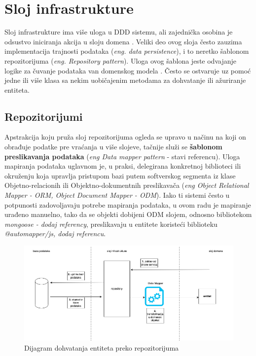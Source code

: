 \documentclass[12pt,oneside]{memoir}
\begin{document}
\section{Sloj infrastrukture}

Sloj infrastrukture ima više uloga u DDD sistemu, ali zajednička osobina je odsustvo iniciranja akcija u sloju domena \cite{dddfull}. Veliki deo ovog sloja često zauzima implementacija trajnosti podataka (\textit{eng. data persistence}), i to neretko šablonom repozitorijuma (\textit{eng. Repository pattern}). Uloga ovog šablona jeste odvajanje logike za čuvanje podataka van domenskog modela \cite{msrepository}. Često se ostvaruje uz pomoć jedne ili više klasa sa nekim uobičajenim metodama za dohvatanje ili ažuriranje entiteta.


\subsection{Repozitorijumi}
Apstrakcija koju pruža sloj repozitorijuma ogleda se upravo u načinu na koji on obrađuje podatke pre vraćanja u više slojeve, tačnije služi se \textbf{šablonom preslikavanja podataka} (\textit{eng Data mapper pattern} - stavi referencu). Uloga mapiranja podataka uglavnom je, u praksi, delegirana konkretnoj biblioteci ili okruženju koja upravlja pristupom bazi putem softverskog segmenta iz klase Objetno-relacionih ili Objektno-dokumentnih preslikavača (\textit{eng Object Relational Mapper - ORM, Object Document Mapper - ODM}). Iako ti sistemi često u potpunosti zadovoljavaju potrebe mapiranja podataka, u ovom radu je mapiranje urađeno manuelno, tako da se objekti dobijeni ODM slojem, odnosno bibliotekom \textit{mongoose - dodaj referency}, preslikavaju u entitete koristeći biblioteku \textit{@automapper/js, dodaj referencu}.

\begin{figure}[h]
  \centering
  \includegraphics[width=1\textwidth]{docs/images/ch_2/repository.png} 
  \caption{Dijagram dohvatanja entiteta preko repozitorijuma}
  \label{fig:sample}
\end{figure}
\end{document}
